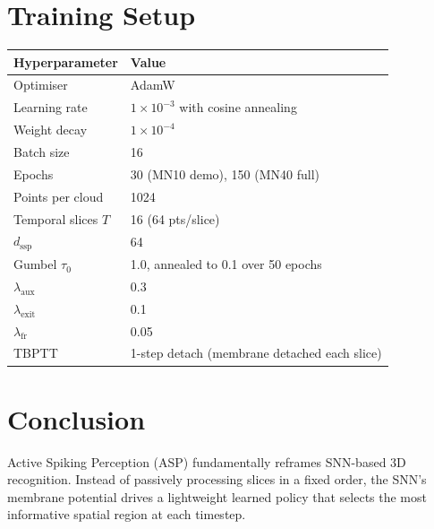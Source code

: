 \documentclass[11pt,a4paper]{article}
\begin{document}
\section{Training Setup}

\begin{center}
\begin{tabular}{ll}
\toprule
Hyperparameter & Value \\
\midrule
Optimiser & AdamW \\
Learning rate & $1\times10^{-3}$ with cosine annealing \\
Weight decay & $1\times10^{-4}$ \\
Batch size & 16 \\
Epochs & 30 (MN10 demo), 150 (MN40 full) \\
Points per cloud & 1024 \\
Temporal slices $T$ & 16 (64 pts/slice) \\
$d_\text{ssp}$ & 64 \\
Gumbel $\tau_0$ & 1.0, annealed to 0.1 over 50 epochs \\
$\lambda_\text{aux}$ & 0.3 \\
$\lambda_\text{exit}$ & 0.1 \\
$\lambda_\text{fr}$ & 0.05 \\
TBPTT & 1-step detach (membrane detached each slice) \\
\bottomrule
\end{tabular}
\end{center}

\section{Conclusion}

Active Spiking Perception (ASP) fundamentally reframes SNN-based 3D recognition.
Instead of passively processing slices in a fixed order, the SNN's membrane
potential drives a lightweight learned policy that selects the most informative
spatial region at each timestep.
\end{document}
